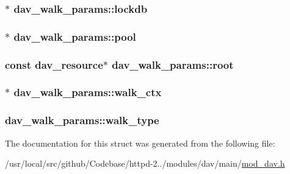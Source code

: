 \subsubsection[{\texorpdfstring{lockdb}{lockdb}}]{$\ast$ dav\+\_\+walk\+\_\+params\+::lockdb}\hypertarget{structdav__walk__params_a2e861fbd5fbcc684d61d464a7186c906}{}\label{structdav__walk__params_a2e861fbd5fbcc684d61d464a7186c906}
\subsubsection[{\texorpdfstring{pool}{pool}}]{$\ast$ dav\+\_\+walk\+\_\+params\+::pool}\hypertarget{structdav__walk__params_a510a9eb72f64d77f780f3a5b83e73165}{}\label{structdav__walk__params_a510a9eb72f64d77f780f3a5b83e73165}
\subsubsection[{\texorpdfstring{root}{root}}]{\setlength{\rightskip}{0pt plus 5cm}const {\bf dav\+\_\+resource}$\ast$ dav\+\_\+walk\+\_\+params\+::root}\hypertarget{structdav__walk__params_a42b1e5b5b1a86ded12015260dc28ce89}{}\label{structdav__walk__params_a42b1e5b5b1a86ded12015260dc28ce89}
\subsubsection[{\texorpdfstring{walk\+\_\+ctx}{walk_ctx}}]{$\ast$ dav\+\_\+walk\+\_\+params\+::walk\+\_\+ctx}\hypertarget{structdav__walk__params_a476b879ce49370324a3b150f2bfa77ea}{}\label{structdav__walk__params_a476b879ce49370324a3b150f2bfa77ea}
\subsubsection[{\texorpdfstring{walk\+\_\+type}{walk_type}}]{ dav\+\_\+walk\+\_\+params\+::walk\+\_\+type}\hypertarget{structdav__walk__params_a10c05b514a19d58e7a2874db19b97663}{}\label{structdav__walk__params_a10c05b514a19d58e7a2874db19b97663}


The documentation for this struct was generated from the following file\+:\begin{DoxyCompactItemize}
\item 
/usr/local/src/github/\+Codebase/httpd-\/2../modules/dav/main/\hyperlink{mod__dav_8h}{mod\+\_\+dav.\+h}\end{DoxyCompactItemize}
